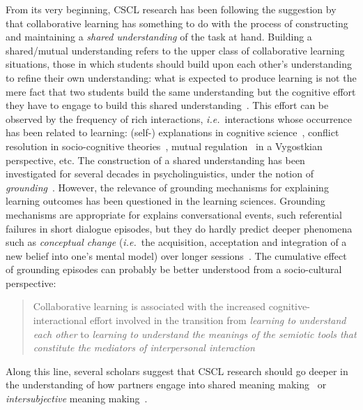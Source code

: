 \documentclass[natbib]{svjour3}
\newcommand{\ie}{{\textit{i.e.\ }}}
\begin{document}
From its very beginning, CSCL research has been following the suggestion by
\citet{roschelle1995construction} that collaborative learning has something to
do with the process of constructing and maintaining a \emph{shared
understanding} of the task at hand. Building a shared/mutual understanding
refers to the upper class of collaborative learning situations, those in which
students should build upon each other's understanding to refine their own
understanding: what is expected to produce learning is not the mere fact that
two students build the same understanding but the cognitive effort they have to
engage to build this shared understanding~\citep{schwartz1995emergence}. This
effort can be observed by the frequency of rich interactions, \ie interactions
whose occurrence has been related to learning: (self-) explanations in cognitive
science~\citep{chi1989self, webb1991task}, conflict resolution in
socio-cognitive theories~\citep{doise1975social}, mutual
regulation~\citep{blaye1995collaborative} in a Vygostkian perspective, etc. The
construction of a shared understanding has been investigated for several decades
in psycholinguistics, under the  notion of
\emph{grounding}~\citep{clark1986referring}. However, the relevance of grounding
mechanisms for explaining learning outcomes has been questioned in the learning
sciences. Grounding mechanisms  are appropriate for explains conversational
events, such referential failures in short dialogue episodes, but they do
hardly predict deeper phenomena such as \emph{conceptual change} (\ie the
acquisition, acceptation and integration of a new belief into one's mental
model) over longer sessions~\citep{dillenbourg2006sharing}. The cumulative
effect of grounding episodes can probably be better understood from a
socio-cultural perspective:

\begin{quote}
Collaborative learning is associated with the increased
cognitive-interactional effort involved in the transition from \emph{learning to
understand each other} to \emph{learning to understand the meanings of the semiotic
tools that constitute the mediators of interpersonal
interaction}~\citep{baker1999role}
\end{quote}

Along this line, several scholars suggest that CSCL research should go deeper in
the understanding of how partners engage into shared meaning
making~\citep{stahl2007meaning} or \emph{intersubjective} meaning
making~\citep{suthers2006technology}.
\end{document}
